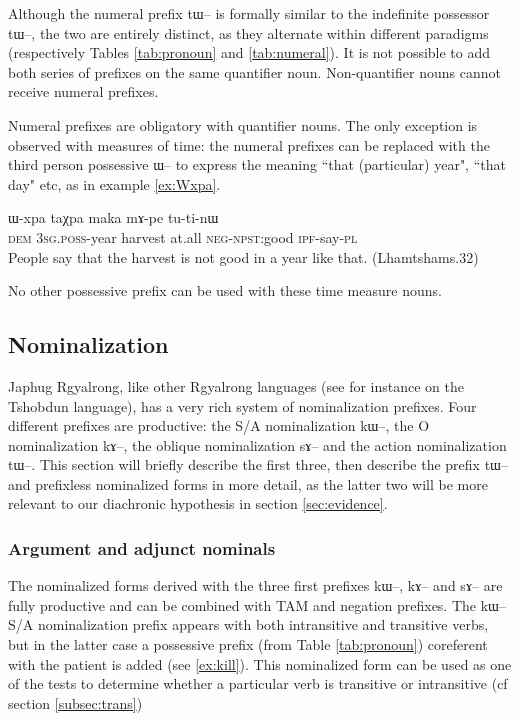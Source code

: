 \documentclass[oldfontcommands,oneside,a4paper,11pt]{article}
\newcommand{\ipa}[1]{{\phon \mbox{#1}}} %
\begin{document}
Although the numeral prefix \ipa{tɯ--} is formally similar to the indefinite possessor \ipa{tɯ--}, the two are entirely distinct, as they alternate within different paradigms (respectively Tables \ref{tab:pronoun} and \ref{tab:numeral}). It is not possible to add both series of prefixes on the same quantifier noun. Non-quantifier nouns cannot receive numeral prefixes.  

Numeral prefixes are obligatory with quantifier nouns. The only exception is observed with measures of time: the numeral prefixes can be replaced  with the third person possessive \ipa{ɯ--} to express the meaning ``that (particular) year", ``that day" etc, as in  example \ref{ex:Wxpa}. 

\begin{exe}
\ex \label{ex:Wxpa}
\gll \ipa{nɯ}   	\ipa{ɯ-xpa}   	\ipa{taχpa}   	\ipa{maka}   	\ipa{mɤ-pe}   	\ipa{tu-ti-nɯ}    \\
\textsc{dem} 3\textsc{sg.poss}-year harvest at.all \textsc{neg-npst}:good \textsc{ipf}-say-\textsc{pl}\\
\glt People say that the harvest is not good in a year like that. (Lhamtshams.32)
\end{exe}

No other possessive prefix can be used with these time measure nouns.

\subsection{Nominalization} \label{subsec:nmlz}
Japhug Rgyalrong, like other Rgyalrong languages (see for instance \citealt{jackson03caodeng} on the Tshobdun language), has a very rich system of nominalization prefixes. Four different prefixes are productive: the S/A nominalization \ipa{kɯ--}, the O nominalization \ipa{kɤ--}, the oblique nominalization \ipa{sɤ--}  and the action nominalization \ipa{tɯ--}. This section will briefly describe the first three, then describe the prefix \ipa{tɯ}-- and prefixless nominalized forms in more detail, as the latter two will be more relevant to our diachronic hypothesis in section \ref{sec:evidence}.  

\subsubsection{Argument and adjunct nominals} \label{subsubsec:arg}
The nominalized forms derived with the three first prefixes \ipa{kɯ--}, \ipa{kɤ}-- and \ipa{sɤ}-- are fully productive and can be combined with TAM and negation prefixes.  The \ipa{kɯ--} S/A nominalization prefix appears with both intransitive and transitive verbs, but in the latter case a possessive prefix (from Table \ref{tab:pronoun}) coreferent with the patient is added (see \ref{ex:kill}). This nominalized form can be used as one of the tests to determine whether a particular verb is transitive or intransitive (cf section \ref{subsec:trans})
\end{document}
